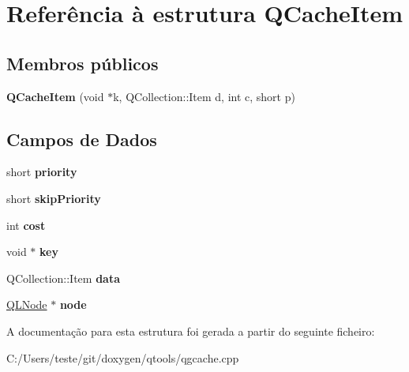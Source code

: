 \hypertarget{struct_q_cache_item}{\section{Referência à estrutura Q\-Cache\-Item}
\label{struct_q_cache_item}
}
\subsection*{Membros públicos}
\begin{DoxyCompactItemize}
\item 
\hypertarget{struct_q_cache_item_a1ecbf0c9a96c9a22e233d74026803055}{{\bfseries Q\-Cache\-Item} (void $\ast$k, Q\-Collection\-::\-Item d, int c, short p)}\label{struct_q_cache_item_a1ecbf0c9a96c9a22e233d74026803055}

\end{DoxyCompactItemize}
\subsection*{Campos de Dados}
\begin{DoxyCompactItemize}
\item 
\hypertarget{struct_q_cache_item_a37ad1d34f9467261adc1c3dd8ee56805}{short {\bfseries priority}}\label{struct_q_cache_item_a37ad1d34f9467261adc1c3dd8ee56805}

\item 
\hypertarget{struct_q_cache_item_a51edfbb933e339a1821d94da76a1dd7d}{short {\bfseries skip\-Priority}}\label{struct_q_cache_item_a51edfbb933e339a1821d94da76a1dd7d}

\item 
\hypertarget{struct_q_cache_item_a66700f11d42fee2413e58dbf49c43ee1}{int {\bfseries cost}}\label{struct_q_cache_item_a66700f11d42fee2413e58dbf49c43ee1}

\item 
\hypertarget{struct_q_cache_item_ab5c000aec752f2206131e183daf5efbf}{void $\ast$ {\bfseries key}}\label{struct_q_cache_item_ab5c000aec752f2206131e183daf5efbf}

\item 
\hypertarget{struct_q_cache_item_aaa0f0dbf0a3f82ea3bfdea9bca2041fb}{Q\-Collection\-::\-Item {\bfseries data}}\label{struct_q_cache_item_aaa0f0dbf0a3f82ea3bfdea9bca2041fb}

\item 
\hypertarget{struct_q_cache_item_ada71eae6953f7d707c1eb3abdfd7107f}{\hyperlink{class_q_l_node}{Q\-L\-Node} $\ast$ {\bfseries node}}\label{struct_q_cache_item_ada71eae6953f7d707c1eb3abdfd7107f}

\end{DoxyCompactItemize}


A documentação para esta estrutura foi gerada a partir do seguinte ficheiro\-:\begin{DoxyCompactItemize}
\item 
C\-:/\-Users/teste/git/doxygen/qtools/qgcache.\-cpp\end{DoxyCompactItemize}
